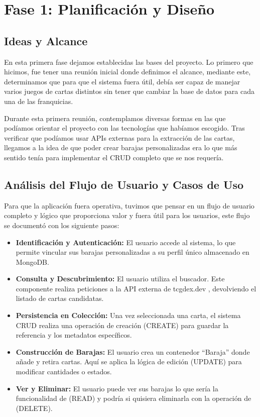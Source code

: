 \chapter{Fase 1: Planificación y Diseño}\label{cap:planificacion}

\section{Ideas y Alcance}

En esta primera fase dejamos establecidas las bases del proyecto. Lo primero que hicimos, fue tener una reunión inicial donde definimos el alcance, mediante este, determinamos que para que el sistema fuera útil, debía ser capaz de manejar varios juegos de cartas distintos sin tener que cambiar la base de datos para cada una de las franquicias.

Durante esta primera reunión, contemplamos diversas formas en las que podíamos orientar el proyecto con las tecnologías que habíamos escogido. Tras verificar que podíamos usar APIs externas para la extracción de las cartas, llegamos a la idea de que poder crear barajas personalizadas era lo que más sentido tenía para implementar el CRUD completo que se nos requería.

\section{Análisis del Flujo de Usuario y Casos de Uso}

Para que la aplicación fuera operativa, tuvimos que pensar en un flujo de usuario completo y lógico que proporciona valor y fuera útil para los usuarios, este flujo se documentó con los siguiente pasos:

\begin{itemize}
    \item \textbf{Identificación y Autenticación:} El usuario accede al sistema, lo que permite vincular sus barajas personalizadas a su perfil único almacenado en MongoDB.
    \item \textbf{Consulta y Descubrimiento:} El usuario utiliza el buscador. Este componente realiza peticiones a la API externa de tcgdex.dev \cite{tcgdexApi}, devolviendo el listado de cartas candidatas.
    \item \textbf{Persistencia en Colección:} Una vez seleccionada una carta, el sistema CRUD realiza una operación de creación (CREATE) para guardar la referencia y los metadatos específicos.
    \item \textbf{Construcción de Barajas:} El usuario crea un contenedor ``Baraja'' donde añade y retira cartas. Aquí se aplica la lógica de edición (UPDATE) para modificar cantidades o estados.
    \item \textbf{Ver y Eliminar:} El usuario puede ver sus barajas lo que sería la funcionalidad de (READ) y podría si quisiera eliminarla con la operación de (DELETE).
\end{itemize}

